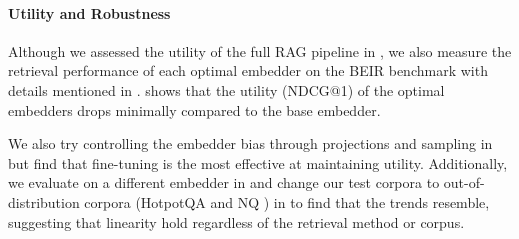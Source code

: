 \paragraph{Utility and Robustness}
Although we assessed the utility of the full RAG pipeline in , we also measure the retrieval performance of each optimal embedder on the BEIR benchmark \citep{thakur2021beir} with details mentioned in .  shows that the utility (NDCG@1) of the optimal embedders drops minimally compared to the base embedder. 

We also try controlling the embedder bias through projections and sampling in  but find that fine-tuning is the most effective at maintaining utility. Additionally, we evaluate on a different embedder \citep[\texttt{E5-base-v2};][]{wang2022text} in  and change our test corpora to out-of-distribution corpora (HotpotQA \citep{yang2018hotpotqa} and NQ \citep{burnham2024politicaldebateefficientzeroshot}) in  to find that the trends resemble, suggesting that linearity hold regardless of the retrieval method or corpus.

